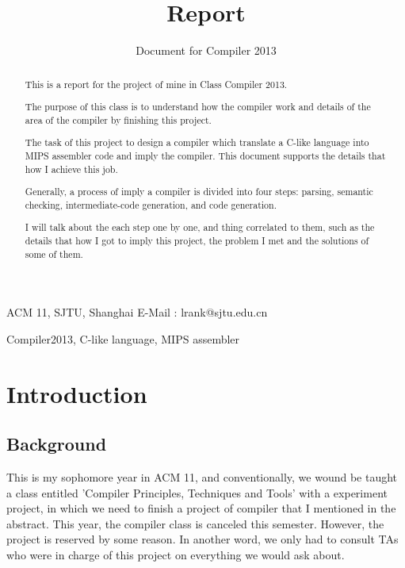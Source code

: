 \documentclass[preprint, 9pt]{sigplanconf}
\begin{document}
\copyrightdata{}

\titlebanner{}

\title{Report}
\subtitle{Document for Compiler 2013}

           {ACM 11, SJTU, Shanghai}
           {E-Mail : lrank@sjtu.edu.cn}

\maketitle

\begin{abstract}
    This is a report for the project of mine in Class Compiler 2013.

    The purpose of this class is to understand how the compiler work and details of the area of the compiler by finishing this project.

    The task of this project to design a compiler which translate a C-like language into MIPS assembler code and imply the compiler.
    This document supports the details that how I achieve this job.

    Generally, a process of imply a compiler is divided into four steps: parsing, semantic checking, intermediate-code generation, and code generation.

    I will talk about the each step one by one, and thing correlated to them, such as the details that how I got to imply this project, the problem I met and the solutions of some of them.

\end{abstract}

\keywords
Compiler2013, C-like language, MIPS assembler

\section{Introduction}

    \subsection{Background}
    This is my sophomore year in ACM 11, and conventionally, we wound be taught a class entitled 'Compiler Principles, Techniques and Tools' with a experiment project, in which we need to finish a project of compiler that I mentioned in the abstract.
    This year, the compiler class is canceled this semester.
    However, the project is reserved by some reason.
    In another word, we only had to consult TAs who were in charge of this project on everything we would ask about.
\end{document}

